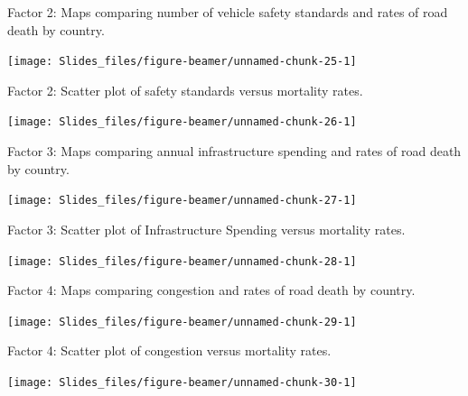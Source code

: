 \documentclass[ignorenonframetext,]{beamer}
\begin{document}
\begin{frame}{Factor 2: Maps comparing number of vehicle safety
standards and rates of road death by country.}

\begin{center}\texttt{[image: Slides\_files/figure-beamer/unnamed-chunk-25-1]} \end{center}

\end{frame}

\begin{frame}{Factor 2: Scatter plot of safety standards versus
mortality rates.}

\begin{center}\texttt{[image: Slides\_files/figure-beamer/unnamed-chunk-26-1]} \end{center}

\end{frame}

\begin{frame}{Factor 3: Maps comparing annual infrastructure spending
and rates of road death by country.}

\begin{center}\texttt{[image: Slides\_files/figure-beamer/unnamed-chunk-27-1]} \end{center}

\end{frame}

\begin{frame}{Factor 3: Scatter plot of Infrastructure Spending versus
mortality rates.}

\begin{center}\texttt{[image: Slides\_files/figure-beamer/unnamed-chunk-28-1]} \end{center}

\end{frame}

\begin{frame}{Factor 4: Maps comparing congestion and rates of road
death by country.}

\begin{center}\texttt{[image: Slides\_files/figure-beamer/unnamed-chunk-29-1]} \end{center}

\end{frame}

\begin{frame}{Factor 4: Scatter plot of congestion versus mortality
rates.}

\begin{center}\texttt{[image: Slides\_files/figure-beamer/unnamed-chunk-30-1]} \end{center}

\end{frame}
\end{document}
